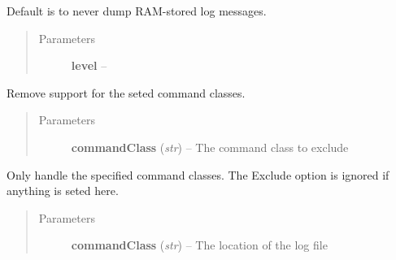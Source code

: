 \documentclass[letterpaper,10pt,english]{sphinxmanual}
\begin{document}
\begin{fulllineitems}
\begin{fulllineitems}
\end{fulllineitems}


\begin{fulllineitems}
\label{option:openzwave.option.ZWaveOption.set_dump_trigger_level}
Default is to never dump RAM-stored log messages.
\begin{quote}\begin{description}
\item[{Parameters}] \leavevmode
\textbf{level} -- 

\end{description}\end{quote}

\end{fulllineitems}


\begin{fulllineitems}
\label{option:openzwave.option.ZWaveOption.set_exclude}
Remove support for the seted command classes.
\begin{quote}\begin{description}
\item[{Parameters}] \leavevmode
\textbf{commandClass} (\emph{str}) -- The command class to exclude

\end{description}\end{quote}

\end{fulllineitems}


\begin{fulllineitems}
\label{option:openzwave.option.ZWaveOption.set_include}
Only handle the specified command classes.  The Exclude option is ignored if anything is seted here.
\begin{quote}\begin{description}
\item[{Parameters}] \leavevmode
\textbf{commandClass} (\emph{str}) -- The location of the log file

\end{description}\end{quote}


\end{fulllineitems}
\end{fulllineitems}
\end{document}
